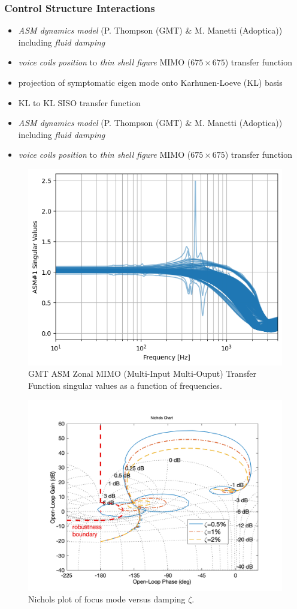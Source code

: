 \documentclass[]{AO4ELT}  %
\begin{document}
\subsubsection{Control Structure Interactions}
\label{sec:fem-csi}

\begin{itemize}
   \item \emph{ASM dynamics model} (P. Thompson (GMT) \& M. Manetti (Adoptica)) including \emph{fluid damping}
   \item \emph{voice coils position} to \emph{thin shell figure} MIMO ($675\times 675$) transfer function
\end{itemize}
\begin{itemize}
   \item projection of symptomatic eigen mode onto Karhunen-Loeve (KL) basis
   \item KL to KL SISO transfer function
\end{itemize}

\begin{itemize}
   \item \emph{ASM dynamics model} (P. Thompson (GMT) \& M. Manetti (Adoptica)) including \emph{fluid damping}
   \item \emph{voice coils position} to \emph{thin shell figure} MIMO ($675\times 675$) transfer function
\end{itemize}

\begin{figure}
   \centering
   \includegraphics[width=0.6\linewidth]{asm-mimo-svd.png}
   \caption{GMT ASM Zonal MIMO (Multi-Input Multi-Ouput) Transfer Function singular values as a function of frequencies.}
   \label{fig:10}
\end{figure}

\begin{figure}
   \centering
   \includegraphics[trim=3cm 0 0 3cm,clip,width=0.6\linewidth]{defocusNicholsLTF.png}
   \caption{Nichols plot of focus mode versus damping $\zeta$.}
   \label{fig:11}
\end{figure}
\end{document}
